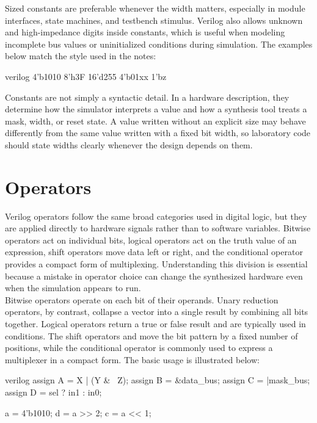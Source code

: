 \noindent Sized constants are preferable whenever the width matters, especially in module interfaces,
state machines, and testbench stimulus. Verilog also allows unknown and high-impedance digits inside
constants, which is useful when modeling incomplete bus values or uninitialized conditions during
simulation. The examples below match the style used in the notes:

\begin{codeblock}{verilog}
4'b1010
8'h3F
16'd255
4'b01xx
1'bz
\end{codeblock}

\noindent Constants are not simply a syntactic detail. In a hardware description, they determine how
the simulator interprets a value and how a synthesis tool treats a mask, width, or reset state. A
value written without an explicit size may behave differently from the same value written with a
fixed bit width, so laboratory code should state widths clearly whenever the design depends on them.

\section{Operators}

Verilog operators follow the same broad categories used in digital logic, but they are applied
directly to hardware signals rather than to software variables. Bitwise operators act on individual
bits, logical operators act on the truth value of an expression, shift operators move data left or
right, and the conditional operator provides a compact form of multiplexing. Understanding this
division is essential because a mistake in operator choice can change the synthesized hardware even
when the simulation appears to run.\\

\noindent Bitwise operators operate on each bit of their operands. Unary reduction operators, by
contrast, collapse a vector into a single result by combining all bits together. Logical operators
return a true or false result and are typically used in conditions. The shift operators
\inlinecode{<<} and \inlinecode{>>} move the bit pattern by a fixed number of positions, while the
conditional operator  is commonly used to express a multiplexer in a compact form.
The basic usage is illustrated below:

\begin{codeblock}{verilog}
assign A = X | (Y & ~Z);
assign B = &data_bus;
assign C = |mask_bus;
assign D = sel ? in1 : in0;

a = 4'b1010;
d = a >> 2;
c = a << 1;
\end{codeblock}

